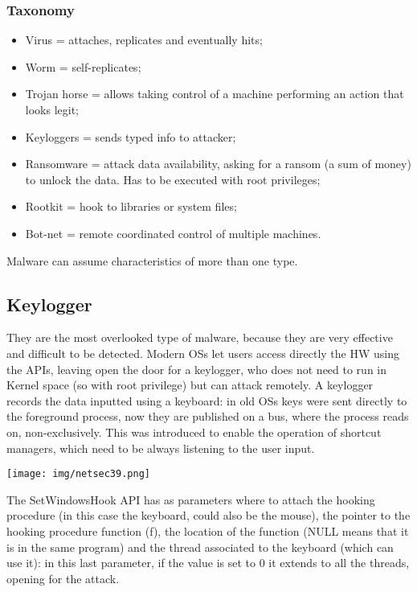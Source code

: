 \documentclass[a4paper, 10pt, titlepage]{article}
\begin{document}
\subsubsection*{Taxonomy}
\begin{itemize}
	\item Virus = attaches, replicates and eventually hits;
	\item Worm = self-replicates;
	\item Trojan horse = allows taking control of a machine performing an action that looks legit;
	\item Keyloggers = sends typed info to attacker;
	\item Ransomware = attack data availability, asking for a ransom (a sum of money) to unlock the data. Has to be executed with root privileges;
	\item Rootkit = hook to libraries or system files;
	\item Bot-net = remote coordinated control of multiple machines.
\end{itemize}
Malware can assume characteristics of more than one type.

\subsection{Keylogger}
They are the most overlooked type of malware, because they are very effective and difficult to be detected. Modern OSs let users access directly the HW using the APIs, leaving open the door for a keylogger, who does not need to run in Kernel space (so with root privilege) but can attack remotely. A keylogger records the data inputted using a keyboard: in old OSs keys were sent directly to the foreground process, now they are published on a bus, where the process reads on, non-exclusively. This was introduced to enable the operation of shortcut managers, which need to be always listening to the user input.
\begin{center}
	\texttt{[image: img/netsec39.png]}
\end{center}
The SetWindowsHook API has as parameters where to attach the hooking procedure (in this case the keyboard, could also be the mouse), the pointer to the hooking procedure function (f), the location of the function (NULL means that it is in the same program) and the thread associated to the keyboard (which can use it): in this last parameter, if the value is set to 0 it extends to all the threads, opening for the attack.
\end{document}

